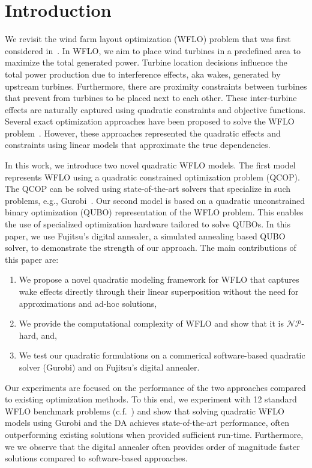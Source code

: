\documentclass[preprint,12pt]{elsarticle}
\begin{document}
\maketitle 

\section{Introduction}

We revisit 
the wind farm layout optimization (WFLO) problem 
that was first considered 
in~\citet{MOSETTI1994105}. 
In WFLO, we aim to place wind turbines 
in a predefined area to maximize 
the total generated power. 
Turbine location decisions    
influence
the
total power production due to  
interference effects, aka wakes, generated by upstream 
turbines. Furthermore, 
there are proximity constraints between turbines
that prevent from turbines to be placed next to each other.
These inter-turbine effects 
are naturally captured using quadratic constraints and objective
functions. Several exact optimization approaches have 
been proposed to solve
the WFLO problem~\cite{turner2014new,Zhang2014}. However, these
approaches represented the quadratic effects and constraints
using linear models that approximate the true dependencies. 

In this work, we introduce two 
novel quadratic WFLO models. The first model 
represents WFLO using a 
quadratic constrained optimization problem (QCOP). 
The QCOP can be solved using state-of-the-art solvers that
specialize in such problems, e.g., Gurobi~\cite{gurobi}. 
Our second model is based on a quadratic unconstrained binary optimization (QUBO) representation of the WFLO 
problem.
This enables the use of specialized optimization hardware tailored to solve
QUBOs. In this paper, we use Fujitsu's digital annealer, a simulated annealing based QUBO solver, to demonstrate the strength
of our approach. The main contributions of this paper are: 
\begin{enumerate} 
\item We propose a novel quadratic modeling framework for WFLO that captures wake 
effects directly through their linear superposition 
without the need for approximations and ad-hoc solutions,
\item We provide the computational complexity of WFLO and show that it is $\mathcal{NP}$-hard, and, 
\item We test our quadratic formulations
on a commerical software-based quadratic solver (Gurobi) and on Fujitsu's digital 
annealer. 
\end{enumerate} Our experiments are focused on the performance of the two approaches
compared to 
existing optimization methods. To this end,
we experiment with 12 standard WFLO benchmark problems (c.f.~\cite{turner2014new})
and show that solving quadratic WFLO models
using Gurobi and the DA
achieves state-of-the-art performance, often outperforming
existing solutions when provided sufficient run-time. Furthermore, we
we observe that the digital 
annealer often provides order of magnitude faster solutions
compared to software-based approaches.
\end{document}
